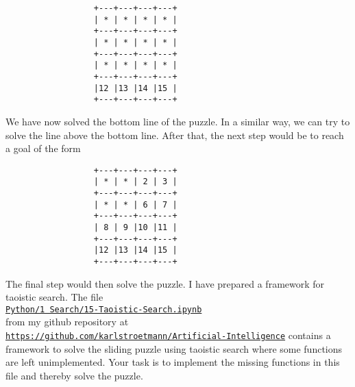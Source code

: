  \begin{verbatim}
                  +---+---+---+---+
                  | * | * | * | * |
                  +---+---+---+---+
                  | * | * | * | * |
                  +---+---+---+---+
                  | * | * | * | * |
                  +---+---+---+---+
                  |12 |13 |14 |15 |
                  +---+---+---+---+
 \end{verbatim}
 We have now solved the bottom line of the puzzle.  In a similar way, we can try to solve the line above the
 bottom line.  After that, the next step would be to reach a goal of the form
 \begin{verbatim}
                  +---+---+---+---+
                  | * | * | 2 | 3 |
                  +---+---+---+---+
                  | * | * | 6 | 7 |
                  +---+---+---+---+
                  | 8 | 9 |10 |11 |
                  +---+---+---+---+
                  |12 |13 |14 |15 |
                  +---+---+---+---+
\end{verbatim}
The final step would then solve the puzzle.  I have prepared a framework for taoistic search.  The file
\\[0.2cm]
\hspace*{1.5cm}
\href{https://github.com/karlstroetmann/Artificial-Intelligence/blob/master/Python/1%20Search/15-Taoistic-Search.ipynb}{\texttt{Python/1 Search/15-Taoistic-Search.ipynb}}
\\[0.2cm]
from my github repository at
\href{https://github.com/karlstroetmann/Artificial-Intelligence/}{\texttt{https://github.com/karlstroetmann/Artificial-Intelligence}} \linebreak
contains a framework to solve the sliding puzzle using taoistic search where some functions are left unimplemented.  
 Your task is to implement the missing functions in this file and thereby solve the puzzle.
 \eox


